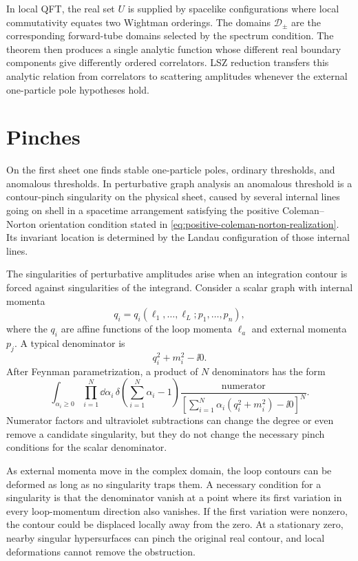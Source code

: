 In local QFT, the real set \(U\) is supplied by spacelike configurations where
local commutativity equates two Wightman orderings.  The domains
\(\mathcal D_\pm\) are the corresponding forward-tube domains selected by the
spectrum condition.  The theorem then produces a single analytic function
whose different real boundary components give differently ordered
correlators.  LSZ reduction transfers this analytic relation from correlators
to scattering amplitudes whenever the external one-particle pole hypotheses
hold.

\section{Pinches}

On the first sheet one finds stable one-particle poles, ordinary thresholds,
and anomalous thresholds.  In perturbative graph analysis an anomalous
threshold is a contour-pinch singularity on the physical sheet, caused by
several internal lines going on shell in a spacetime arrangement satisfying
the positive Coleman--Norton orientation condition stated in
\eqref{eq:positive-coleman-norton-realization}.  Its invariant location is
determined by the Landau configuration of those internal lines.

The singularities of perturbative amplitudes arise when an integration contour
is forced against singularities of the integrand.  Consider a scalar graph with
internal momenta
\[
  q_i=q_i(\ell_1,\ldots,\ell_L;p_1,\ldots,p_n),
\]
where the \(q_i\) are affine functions of the loop momenta \(\ell_a\) and
external momenta \(p_j\).  A typical denominator is
\[
  q_i^2+m_i^2-\ii0 .
\]
After Feynman parametrization, a product of \(N\) denominators has the form
\[
  \int_{\alpha_i\ge0}
  \prod_{i=1}^N\dd\alpha_i\,
  \delta\!\left(\sum_{i=1}^N\alpha_i-1\right)
  \frac{\text{numerator}}
       {\left[\sum_{i=1}^N\alpha_i(q_i^2+m_i^2)-\ii0\right]^N}.
\]
Numerator factors and ultraviolet subtractions can change the degree or even
remove a candidate singularity, but they do not change the necessary pinch
conditions for the scalar denominator.

As external momenta move in the complex domain, the loop contours can be
deformed as long as no singularity traps them.  A necessary condition for a
singularity is that the denominator vanish at a point where its first
variation in every loop-momentum direction also vanishes.  If the first
variation were nonzero, the contour could be displaced locally away from the
zero.  At a stationary zero, nearby singular hypersurfaces can pinch the
original real contour, and local deformations cannot remove the obstruction.

